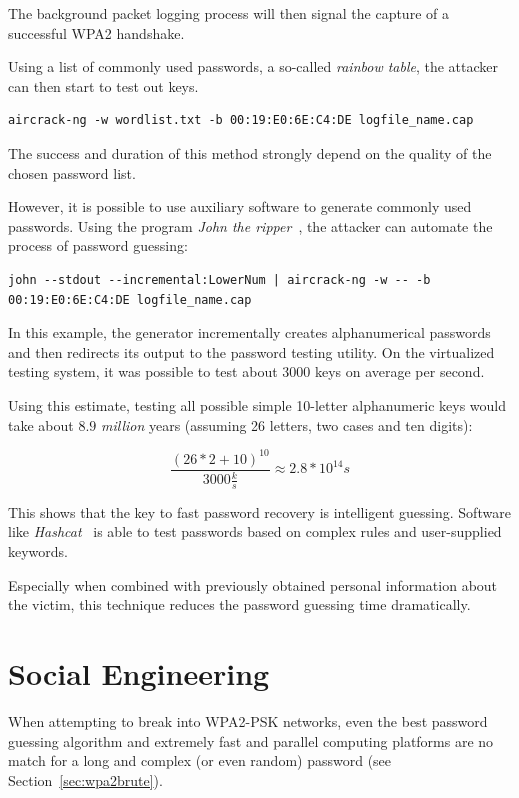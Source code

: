 The background packet logging process will then signal the capture of a successful WPA2 handshake.

Using a list of commonly used passwords, a so-called \emph{rainbow table}, the attacker can then start to test out keys.

\begin{lstlisting}
aircrack-ng -w wordlist.txt -b 00:19:E0:6E:C4:DE logfile_name.cap
\end{lstlisting}

The success and duration of this method strongly depend on the quality of the chosen password list.

However, it is possible to use auxiliary software to generate commonly used passwords. Using the program \emph{John the ripper}~\cite{Openwall17}, the attacker can automate the process of password guessing:

\begin{lstlisting}
john --stdout --incremental:LowerNum | aircrack-ng -w -- -b 00:19:E0:6E:C4:DE logfile_name.cap
\end{lstlisting}

In this example, the generator incrementally creates alphanumerical passwords and then redirects its output to the password testing utility. On the virtualized testing system, it was possible to test about 3000 keys on average per second.

Using this estimate, testing all possible simple 10-letter alphanumeric keys would take about \(8.9\) \emph{million} years (assuming 26 letters, two cases and ten digits):

\begin{displaymath}
\frac{{(26 * 2 + 10)}^{10}}{3000\frac{k}{s}}\approx2.8*10^{14} s
\end{displaymath}

This shows that the key to fast password recovery is intelligent guessing. Software like \emph{Hashcat}~\cite{Steube17} is able to test passwords based on complex rules and user-supplied keywords.

Especially when combined with previously obtained personal information about the victim, this technique reduces the password guessing time dramatically.

\section{Social Engineering}\label{sec:attackuser}

When attempting to break into WPA2-PSK networks, even the best password guessing algorithm and extremely fast and parallel computing platforms are no match for a long and complex (or even random) password (see Section~\ref{sec:wpa2brute}).

